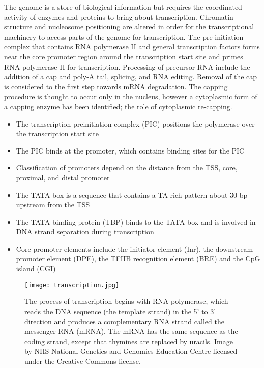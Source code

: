 The genome is a store of biological information but requires the coordinated activity of enzymes and proteins to bring about transcription. Chromatin structure and nucleosome positioning are altered in order for the transcriptional machinery to access parts of the genome for transcription. The pre-initiation complex that contains RNA polymerase II and general transcription factors forms near the core promoter region around the transcription start site and primes RNA polymerase II for transcription. Processing of precursor RNA include the addition of a cap and poly-A tail, splicing, and RNA editing. Removal of the cap is considered to the first step towards mRNA degradation. The capping procedure is thought to occur only in the nucleus, however a cytoplasmic form of a capping enzyme has been identified; the role of cytoplasmic re-capping.

\begin{itemize}

   \item The transcription preinitiation complex (PIC) positions the polymerase over the transcription start site
   \item The PIC binds at the promoter, which contains binding sites for the PIC
   \item Classification of promoters depend on the distance from the TSS, core, proximal, and distal promoter
   \item The TATA box is a sequence that contains a TA-rich pattern about 30 bp upstream from the TSS
   \item The TATA binding protein (TBP) binds to the TATA box and is involved in DNA strand separation during transcription
   \item Core promoter elements include the initiator element (Inr), the downstream promoter element (DPE), the TFIIB recognition element (BRE) and the CpG island (CGI)

\end{itemize}

\begin{figure}[h]
   \centering
   \texttt{[image: transcription.jpg]}
   \caption[DNA transcription]{The process of transcription begins with RNA polymerase, which reads the DNA sequence (the template strand) in the 5' to 3' direction and produces a complementary RNA strand called the messenger RNA (mRNA). The mRNA has the same sequence as the coding strand, except that thymines are replaced by uracils. Image by NHS National Genetics and Genomics Education Centre licensed under the Creative Commons license.}
   \label{fig:transcription}
\end{figure}

